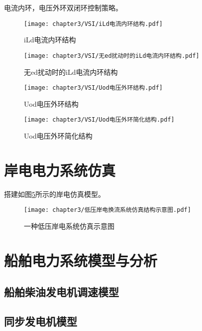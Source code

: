 电流内环，电压外环双闭环控制策略。

\begin{figure}[!htp]
	\centering
	\texttt{[image: chapter3/VSI/iLd电流内环结构.pdf]}
	\caption{iLd电流内环结构}
	\label{fig:iLd电流内环结构}
\end{figure}

\begin{figure}[!htp]
	\centering
	\texttt{[image: chapter3/VSI/无ed扰动时的iLd电流内环结构.pdf]}
	\caption{无ed扰动时的iLd电流内环结构}
	\label{fig:无ed扰动时的iLd电流内环结构}
\end{figure}

\begin{figure}[!htp]
	\centering
	\texttt{[image: chapter3/VSI/Uod电压外环结构.pdf]}
	\caption{Uod电压外环结构}
	\label{fig:Uod电压外环结构}
\end{figure}

\begin{figure}[!htp]
	\centering
	\texttt{[image: chapter3/VSI/Uod电压外环简化结构.pdf]}
	\caption{Uod电压外环简化结构}
	\label{fig:Uod电压外环简化结构}
\end{figure}

\section{岸电电力系统仿真}

搭建如图\ref{fig:低压岸电系统仿真示意图}所示的岸电仿真模型。

\begin{figure}[!htp]
	\centering
	\texttt{[image: chapter3/低压岸电换流系统仿真结构示意图.pdf]}
	\caption{一种低压岸电系统仿真示意图}
	\label{fig:低压岸电系统仿真示意图}
\end{figure}

\section{船舶电力系统模型与分析}

\subsection{船舶柴油发电机调速模型}

\subsection{同步发电机模型}

